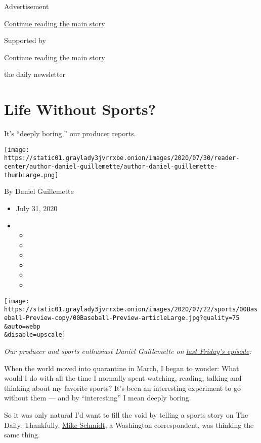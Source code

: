 Advertisement

\protect\hyperlink{after-top}{Continue reading the main story}

Supported by

\protect\hyperlink{after-sponsor}{Continue reading the main story}

the daily newsletter

\hypertarget{life-without-sports}{%
\section{Life Without Sports?}\label{life-without-sports}}

It's ``deeply boring,'' our producer reports.

\texttt{[image: https://static01.graylady3jvrrxbe.onion/images/2020/07/30/reader-center/author-daniel-guillemette/author-daniel-guillemette-thumbLarge.png]}

By Daniel Guillemette

\begin{itemize}
\item
  July 31, 2020
\item
  \begin{itemize}
  \item
  \item
  \item
  \item
  \item
  \item
  \end{itemize}
\end{itemize}

\texttt{[image: https://static01.graylady3jvrrxbe.onion/images/2020/07/22/sports/00Baseball-Preview-copy/00Baseball-Preview-articleLarge.jpg?quality=75\\\&auto=webp\\\&disable=upscale]}

\emph{Our producer and sports enthusiast Daniel Guillemette on}
\href{https://www.nytimes3xbfgragh.onion/2020/07/24/podcasts/the-daily/mlb-baseball-season-coronavirus.html}{\emph{last
Friday's episode}}\emph{:}

When the world moved into quarantine in March, I began to wonder: What
would I do with all the time I normally spent watching, reading, talking
and thinking about my favorite sports? It's been an interesting
experiment to go without them --- and by ``interesting'' I mean deeply
boring.

So it was only natural I'd want to fill the void by telling a sports
story on The Daily. Thankfully,
\href{https://www.nytimes3xbfgragh.onion/by/michael-s-schmidt}{Mike
Schmidt}, a Washington correspondent, was thinking the same thing.

